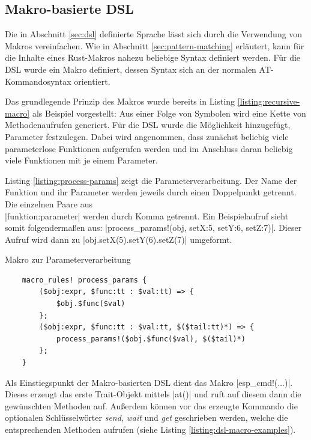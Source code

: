 \documentclass
[ 12pt,
  parskip=half %
]{scrreprt}
\newenvironment{mylisting}[1][H]
{\captionsetup{aboveskip=-0.2\normalbaselineskip}\begin{listing}[#1]}
{\end{listing}}
\begin{document}
\subsection{Makro-basierte DSL}

Die in Abschnitt \ref{sec:dsl} definierte Sprache lässt sich durch die Verwendung von Makros vereinfachen. Wie in Abschnitt \ref{sec:pattern-matching} erläutert, kann für die Inhalte eines Rust-Makros nahezu beliebige Syntax definiert werden. Für die DSL wurde ein Makro definiert, dessen Syntax sich an der normalen AT-Kommandosyntax orientiert. 

Das grundlegende Prinzip des Makros wurde bereits in Listing \ref{listing:recursive-macro} als Beispiel vorgestellt: Aus einer Folge von Symbolen wird eine Kette von Methodenaufrufen generiert. Für die DSL wurde die Möglichkeit hinzugefügt, Parameter festzulegen. Dabei wird angenommen, dass zunächst beliebig viele parameterlose Funktionen aufgerufen werden und im Anschluss daran beliebig viele Funktionen mit je einem Parameter.

Listing \ref{listing:process-params} zeigt die Parameterverarbeitung. Der Name der Funktion und ihr Parameter werden jeweils durch einen Doppelpunkt getrennt. Die einzelnen Paare aus \\ \textinline|funktion:parameter| werden durch Komma getrennt. Ein Beispielaufruf sieht somit folgendermaßen aus:  \rustinline|process_params!(obj, setX:5, setY:6, setZ:7)|.
Dieser Aufruf wird dann zu \rustinline|obj.setX(5).setY(6).setZ(7)| umgeformt.

\begin{mylisting}
	\caption{Makro zur Parameterverarbeitung}
	\label{listing:process-params}
	\begin{verbatim}
	macro_rules! process_params {
		($obj:expr, $func:tt : $val:tt) => { 
			$obj.$func($val)
		};
		($obj:expr, $func:tt : $val:tt, $($tail:tt)*) => {
			process_params!($obj.$func($val), $($tail)*)
		};
	}
	\end{verbatim}
\end{mylisting} 

Als Einstiegspunkt der Makro-basierten DSL dient das Makro \rustinline|esp_cmd!(...)|. Dieses erzeugt das erste Trait-Objekt mittels \rustinline|at()| und ruft auf diesem dann die gewünschten Methoden auf. Außerdem können vor das erzeugte Kommando die optionalen Schlüsselwörter \textit{send}, \textit{wait} und \textit{get} geschrieben werden, welche die entsprechenden Methoden aufrufen (siehe Listing \ref{listing:dsl-macro-examples}). 
\end{document}
